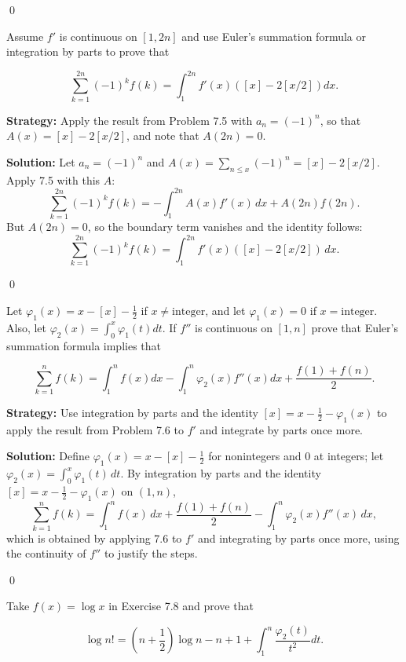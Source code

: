 \qed
\begin{problembox}
Assume $f'$ is continuous on $[1, 2n]$ and use Euler's summation formula or integration by parts to prove that

\[ \sum_{k=1}^{2n} (-1)^k f(k) = \int_1^{2n} f'(x)([x] - 2[x/2]) dx. \]
\end{problembox}

\noindent\textbf{Strategy:} Apply the result from Problem 7.5 with $a_n = (-1)^n$, so that $A(x) = [x] - 2[x/2]$, and note that $A(2n) = 0$.

\bigskip\noindent\textbf{Solution:}
Let $a_n=(-1)^n$ and $A(x)=\sum_{n\le x}(-1)^n=[x]-2[x/2]$. Apply 7.5 with this $A$:
\[\sum_{k=1}^{2n}(-1)^k f(k)= -\int_1^{2n} A(x) f'(x)\,dx + A(2n) f(2n).
\]
But $A(2n)=0$, so the boundary term vanishes and the identity follows:
\[\sum_{k=1}^{2n}(-1)^k f(k)=\int_1^{2n} f'(x)([x]-2[x/2])\,dx.\]




\qed
\begin{problembox}
Let $\varphi_1(x) = x - [x] - \frac{1}{2}$ if $x \neq \text{integer}$, and let  $\varphi_1(x) = 0$  if  $x = \text{integer}$. Also, let  $\varphi_2(x) = \int_0^x \varphi_1(t) dt$. If  $f''$  is continuous on  $[1, n]$  prove that Euler's summation formula implies that

\[ \sum_{k=1}^n f(k) = \int_1^n f(x) dx - \int_1^n \varphi_2(x) f''(x) dx + \frac{f(1) + f(n)}{2}. \]
\end{problembox}

\noindent\textbf{Strategy:} Use integration by parts and the identity $[x] = x - \frac{1}{2} - \varphi_1(x)$ to apply the result from Problem 7.6 to $f'$ and integrate by parts once more.

\bigskip\noindent\textbf{Solution:}
Define $\varphi_1(x)=x-[x]-\tfrac12$ for nonintegers and $0$ at integers; let $\varphi_2(x)=\int_0^x \varphi_1(t)\,dt$. By integration by parts and the identity $[x]=x-\tfrac12-\varphi_1(x)$ on $(1,n)$,
\[\sum_{k=1}^n f(k)=\int_1^n f(x)\,dx + \frac{f(1)+f(n)}{2} - \int_1^n \varphi_2(x) f''(x)\,dx,
\]
which is obtained by applying 7.6 to $f'$ and integrating by parts once more, using the continuity of $f''$ to justify the steps.




\qed
\begin{problembox}
Take $f(x) = \log x$ in Exercise 7.8 and prove that

\[ \log n! = (n + \frac{1}{2}) \log n - n + 1 + \int_1^n \frac{\varphi_2(t)}{t^2} dt. \]
\end{problembox}

